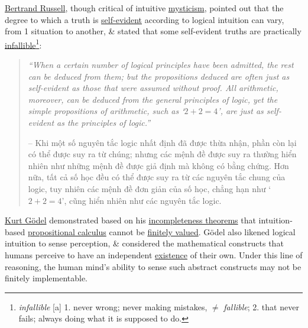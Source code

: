 \documentclass{article}
\begin{document}
\href{https://en.wikipedia.org/wiki/Bertrand_Russell}{\sc Bertrand Russell}, though critical of intuitive \href{https://en.wikipedia.org/wiki/Mysticism#Intuitive_insight_and_enlightenment}{mysticism}, pointed out that the degree to which a truth is \href{https://en.wikipedia.org/wiki/Self-evidence}{self-evident} according to logical intuition can vary, from 1 situation to another, \& stated that some self-evident truths are practically \href{https://en.wikipedia.org/wiki/Infallibility#In_philosophy}{infallible}\footnote{{\it infallible} [a] 1. never wrong; never making mistakes, $\ne$ {\it fallible}; 2. that never fails; always doing what it is supposed to do.}:
\begin{quote}
	{\it``When a certain number of logical principles have been admitted, the rest can be deduced from them; but the propositions deduced are often just as self-evident as those that were assumed without proof. All arithmetic, moreover, can be deduced from the general principles of logic, yet the simple propositions of arithmetic, such as `$2 + 2 = 4$', are just as self-evident as the principles of logic.''}
	
	-- Khi một số nguyên tắc logic nhất định đã được thừa nhận, phần còn lại có thể được suy ra từ chúng; nhưng các mệnh đề được suy ra thường hiển nhiên như những mệnh đề được giả định mà không có bằng chứng. Hơn nữa, tất cả số học đều có thể được suy ra từ các nguyên tắc chung của logic, tuy nhiên các mệnh đề đơn giản của số học, chẳng hạn như `$2 + 2 = 4$', cũng hiển nhiên như các nguyên tắc logic.
\end{quote}
\href{https://en.wikipedia.org/wiki/Kurt_G%C3%B6del}{\sc Kurt G\"odel} demonstrated based on his \href{https://en.wikipedia.org/wiki/G%C3%B6del%27s_incompleteness_theorems}{incompleteness theorems} that intuition-based \href{https://en.wikipedia.org/wiki/Propositional_calculus}{propositional calculus} cannot be \href{https://en.wikipedia.org/wiki/Many-valued_logic}{finitely valued}. G\"odel also likened logical intuition to sense perception, \& considered the mathematical constructs that humans perceive to have an independent \href{https://en.wikipedia.org/wiki/Philosophical_realism}{existence} of their own. Under this line of reasoning, the human mind's ability to sense such abstract constructs may not be finitely implementable.
\end{document}
